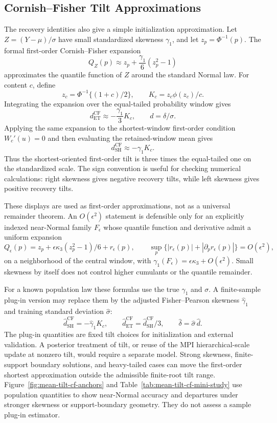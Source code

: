 \documentclass[11pt]{article}
\begin{document}
\subsection{Cornish--Fisher Tilt Approximations}
\label{sec:supp-cf-tilt}

The recovery identities also give a simple initialization approximation. Let
\(Z=(Y-\mu)/\sigma\) have small standardized skewness \(\gamma_1\), and let
\(z_p=\Phi^{-1}(p)\). The formal first-order Cornish--Fisher expansion
\citep{CornishFisher1937}
\[
Q_Z(p)
 \approx
z_p+\frac{\gamma_1}{6}(z_p^2-1)
\]
approximates the quantile function of \(Z\) around the standard Normal law.
For content \(c\), define
\[
z_c=\Phi^{-1}\{(1+c)/2\},\qquad
K_c=z_c\phi(z_c)/c.
\]
Integrating the expansion over the equal-tailed probability window gives
\[
d_{\mathrm{ET}}^{\mathrm{CF}}
\approx
-\frac{\gamma_1}{3}K_c,
\qquad d=\delta/\sigma.
\]
Applying the same expansion to the shortest-window first-order condition
\(W_c'(u)=0\) and then evaluating the retained-window mean gives
\[
d_{\mathrm{SH}}^{\mathrm{CF}}
\approx
-\gamma_1K_c.
\]
Thus the shortest-oriented first-order tilt is three times the equal-tailed
one on the standardized scale. The sign convention is useful for checking
numerical calculations: right skewness gives negative recovery tilts, while left
skewness gives positive recovery tilts.

These displays are used as first-order approximations, not as a universal remainder
theorem. An \(O(\epsilon^2)\) statement is defensible only for an explicitly
indexed near-Normal family \(F_\epsilon\) whose quantile function and
derivative admit a uniform expansion
\[
Q_\epsilon(p)
=z_p+\epsilon\kappa_3(z_p^2-1)/6+r_\epsilon(p),
\qquad
\sup_p\{|r_\epsilon(p)|+|\partial_pr_\epsilon(p)|\}=O(\epsilon^2),
\]
on a neighborhood of the central window, with
\(\gamma_1(F_\epsilon)=\epsilon\kappa_3+O(\epsilon^2)\). Small skewness by
itself does not control higher cumulants or the quantile remainder.

For a known population law these formulas use the true \(\gamma_1\) and
\(\sigma\). A finite-sample plug-in version may replace them by the adjusted
Fisher--Pearson skewness \(\widehat\gamma_1\) and training standard deviation
\(\widehat\sigma\):
\[
\widehat d_{\mathrm{SH}}^{\mathrm{CF}}
=
-\widehat\gamma_1K_c,\qquad
\widehat d_{\mathrm{ET}}^{\mathrm{CF}}
=
\widehat d_{\mathrm{SH}}^{\mathrm{CF}}/3,\qquad
\widehat\delta=\widehat\sigma\,\widehat d.
\]
The plug-in quantities are fixed tilt choices for initialization and external
validation. A posterior treatment of tilt, or reuse of
the MPI hierarchical-scale update at nonzero tilt, would require a separate
model. Strong skewness, finite-support boundary solutions, and heavy-tailed
cases can move the first-order shortest approximation outside the admissible
finite-root tilt range. Figure~\ref{fig:mean-tilt-cf-anchors} and
Table~\ref{tab:mean-tilt-cf-mini-study} use population quantities to show
near-Normal accuracy and departures under stronger skewness or
support-boundary geometry. They do not assess a sample plug-in estimator.
\end{document}
